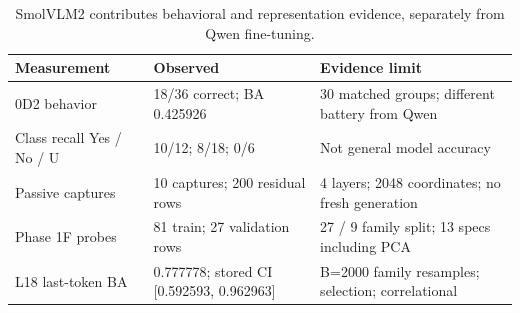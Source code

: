 \begin{table}[t]
\centering\small
\caption{SmolVLM2 contributes behavioral and representation evidence, separately from Qwen fine-tuning.}
\label{tab:t6_smol_measurements}
\begin{tabularx}{\linewidth}{lXX}
\toprule
Measurement & Observed & Evidence limit \\ \midrule
0D2 behavior & 18/36 correct; BA 0.425926 & 30 matched groups; different battery from Qwen \\
Class recall Yes / No / U & 10/12; 8/18; 0/6 & Not general model accuracy \\
Passive captures & 10 captures; 200 residual rows & 4 layers; 2048 coordinates; no fresh generation \\
Phase 1F probes & 81 train; 27 validation rows & 27 / 9 family split; 13 specs including PCA \\
L18 last-token BA & 0.777778; stored CI [0.592593, 0.962963] & B=2000 family resamples; selection; correlational \\
\bottomrule
\end{tabularx}
\end{table}
